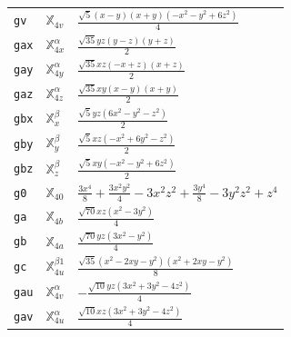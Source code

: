 \documentclass[fleqn,9pt,landscape]{jsarticle}
\begin{document}
\begin{longtable}{lll}
\texttt{gv} & $\mathbb{X}_{4v}^{}$ & $\frac{\sqrt{5} \left(x - y\right) \left(x + y\right) \left(- x^{2} - y^{2} + 6 z^{2}\right)}{4}$ \\
\texttt{gax} & $\mathbb{X}_{4x}^{\alpha}$ & $\frac{\sqrt{35} y z \left(y - z\right) \left(y + z\right)}{2}$ \\
\texttt{gay} & $\mathbb{X}_{4y}^{\alpha}$ & $\frac{\sqrt{35} x z \left(- x + z\right) \left(x + z\right)}{2}$ \\
\texttt{gaz} & $\mathbb{X}_{4z}^{\alpha}$ & $\frac{\sqrt{35} x y \left(x - y\right) \left(x + y\right)}{2}$ \\
\texttt{gbx} & $\mathbb{X}_{x}^{\beta}$ & $\frac{\sqrt{5} y z \left(6 x^{2} - y^{2} - z^{2}\right)}{2}$ \\
\texttt{gby} & $\mathbb{X}_{y}^{\beta}$ & $\frac{\sqrt{5} x z \left(- x^{2} + 6 y^{2} - z^{2}\right)}{2}$ \\
\texttt{gbz} & $\mathbb{X}_{z}^{\beta}$ & $\frac{\sqrt{5} x y \left(- x^{2} - y^{2} + 6 z^{2}\right)}{2}$ \\
\texttt{g0} & $\mathbb{X}_{40}^{}$ & $\frac{3 x^{4}}{8} + \frac{3 x^{2} y^{2}}{4} - 3 x^{2} z^{2} + \frac{3 y^{4}}{8} - 3 y^{2} z^{2} + z^{4}$ \\
\texttt{ga} & $\mathbb{X}_{4b}^{}$ & $\frac{\sqrt{70} x z \left(x^{2} - 3 y^{2}\right)}{4}$ \\
\texttt{gb} & $\mathbb{X}_{4a}^{}$ & $\frac{\sqrt{70} y z \left(3 x^{2} - y^{2}\right)}{4}$ \\
\texttt{gc} & $\mathbb{X}_{4u}^{\beta1}$ & $\frac{\sqrt{35} \left(x^{2} - 2 x y - y^{2}\right) \left(x^{2} + 2 x y - y^{2}\right)}{8}$ \\
\texttt{gau} & $\mathbb{X}_{4v}^{\alpha}$ & $- \frac{\sqrt{10} y z \left(3 x^{2} + 3 y^{2} - 4 z^{2}\right)}{4}$ \\
\texttt{gav} & $\mathbb{X}_{4u}^{\alpha}$ & $\frac{\sqrt{10} x z \left(3 x^{2} + 3 y^{2} - 4 z^{2}\right)}{4}$ \\
\end{longtable}
\renewcommand{\arraystretch}{1.6}
\end{document}
